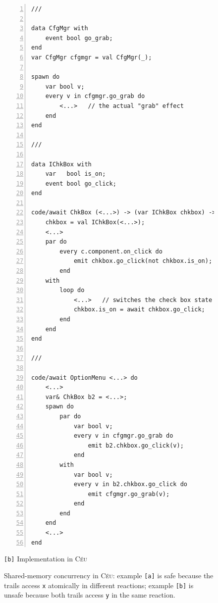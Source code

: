 \documentclass{vgtc}                          %
\newcommand{\CEU}{\textsc{C\'{e}u}\xspace}
\newcommand{\code}[1] {{\small{\texttt{#1}}}}
\newcommand{\ax}{\code{[a]}\xspace}
\newcommand{\bx}{\code{[b]}\xspace}
\begin{document}
\begin{figure}[t]
\begin{minipage}[t]{0.50\linewidth}
\begin{lstlisting}[numbers=left,xleftmargin=3em]
///

data CfgMgr with
    event bool go_grab;
end
var CfgMgr cfgmgr = val CfgMgr(_);

spawn do
    var bool v;
    every v in cfgmgr.go_grab do
        <...>   // the actual "grab" effect
    end
end

///

data IChkBox with
    var   bool is_on;
    event bool go_click;
end

code/await ChkBox (<...>) -> (var IChkBox chkbox) -> FOREVER do
    chkbox = val IChkBox(<...>);
    <...>
    par do
        every c.component.on_click do
            emit chkbox.go_click(not chkbox.is_on);
        end
    with
        loop do
            <...>   // switches the check box state
            chkbox.is_on = await chkbox.go_click;
        end
    end
end

///

code/await OptionMenu <...> do
    <...>
    var& ChkBox b2 = <...>;
    spawn do
        par do
            var bool v;
            every v in cfgmgr.go_grab do
                emit b2.chkbox.go_click(v);
            end
        with
            var bool v;
            every v in b2.chkbox.go_click do
                emit cfgmgr.go_grab(v);
            end
        end
    end
    <...>
end

\end{lstlisting}
\centering\small{\bx Implementation in \CEU}
\end{minipage}
\caption{ Shared-memory concurrency in \CEU:
example \ax is safe because the trails access \code{x} atomically in different 
reactions;
example \bx is unsafe because both trails access \code{y} in the same reaction.
\label{lst.shared}
}
\end{figure}
\end{document}
